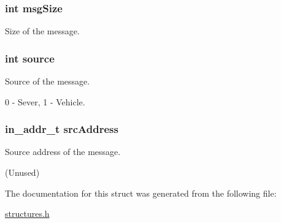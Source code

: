 \subsubsection[{\texorpdfstring{msg\+Size}{msgSize}}]{\setlength{\rightskip}{0pt plus 5cm}int msg\+Size}\hypertarget{struct_m_e_s_s_a_g_e_acafd8e3e9ef0f4c5e7e90fb05aeab3af}{}\label{struct_m_e_s_s_a_g_e_acafd8e3e9ef0f4c5e7e90fb05aeab3af}


Size of the message. 

\subsubsection[{\texorpdfstring{source}{source}}]{\setlength{\rightskip}{0pt plus 5cm}int source}\hypertarget{struct_m_e_s_s_a_g_e_a07a87b2e6ed927503e2f95f119c9fc23}{}\label{struct_m_e_s_s_a_g_e_a07a87b2e6ed927503e2f95f119c9fc23}


Source of the message. 

0 -\/ Sever, 1 -\/ Vehicle. 
\subsubsection[{\texorpdfstring{src\+Address}{srcAddress}}]{\setlength{\rightskip}{0pt plus 5cm}in\+\_\+addr\+\_\+t src\+Address}\hypertarget{struct_m_e_s_s_a_g_e_a0f4a69f9560bd7ce0c2cbdb91e4a06f9}{}\label{struct_m_e_s_s_a_g_e_a0f4a69f9560bd7ce0c2cbdb91e4a06f9}


Source address of the message. 

(Unused) 

The documentation for this struct was generated from the following file\+:\begin{DoxyCompactItemize}
\item 
\hyperlink{structures_8h}{structures.\+h}\end{DoxyCompactItemize}
